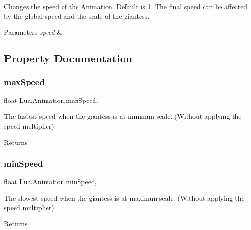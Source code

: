 Changes the speed of the \mbox{\hyperlink{class_lua_1_1_animation}{Animation}}. Default is 1. The final speed can be affected by the global speed and the scale of the giantess. 


\begin{DoxyParams}{Parameters}
{\em speed} & \\
\hline
\end{DoxyParams}


\subsection{Property Documentation}
\mbox{\label{class_lua_1_1_animation_a49aa08ef58b67f1af48526781176fce3}} 
\subsubsection{\texorpdfstring{maxSpeed}{maxSpeed}}
{\footnotesize\ttfamily float Lua.\+Animation.\+max\+Speed\hspace{0.3cm}{\ttfamily [get]}, {\ttfamily [set]}}



The fastest speed when the giantess is at minimun scale. (Without applying the speed multiplier) 

\begin{DoxyReturn}{Returns}

\end{DoxyReturn}
\mbox{\label{class_lua_1_1_animation_a7dee7e3d2e6bdffed96f20822e4bb307}} 
\subsubsection{\texorpdfstring{minSpeed}{minSpeed}}
{\footnotesize\ttfamily float Lua.\+Animation.\+min\+Speed\hspace{0.3cm}{\ttfamily [get]}, {\ttfamily [set]}}



The slowest speed when the giantess is at maximun scale. (Without applying the speed multiplier) 

\begin{DoxyReturn}{Returns}

\end{DoxyReturn}
\mbox{\label{class_lua_1_1_animation_a4418e6d09f625ad76932922c568bf987}} 
